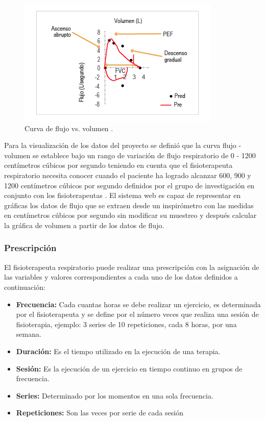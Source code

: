 \documentclass[12pt]{article}
\begin{document}
\begin{itemize}
        \begin{figure}[ht]
        \centering
        \includegraphics[scale=0.7]{imag/flujovs.png}
        \caption{Curva de flujo vs. volumen \cite{36}. }
        \label{4}
        \end{figure}
        \FloatBarrier
    
    
\end{itemize}



Para la visualización de los datos del proyecto se definió que la curva flujo - volumen se establece bajo un rango de variación de flujo respiratorio de  0 - 1200 centímetros cúbicos por segundo teniendo en cuenta que el fisioterapeuta respiratorio necesita conocer cuando el paciente ha logrado alcanzar 600, 900 y 1200 centímetros cúbicos por segundo definidos por el grupo de investigación en conjunto con los fisioterapeutas \cite{45}. El sistema web es capaz de representar en gráficas los datos de flujo que se extraen desde un inspirómetro con las medidas en centímetros cúbicos por segundo sin modificar su muestreo y después calcular la gráfica de volumen a partir de los datos de flujo.


\subsubsection{Prescripción}

El fisioterapeuta respiratorio puede realizar una prescripción con la asignación de las variables y valores correspondientes a cada uno de los datos definidos a continuación: 

\begin{itemize}
    \item \textbf{Frecuencia:} Cada cuantas horas se debe realizar un ejercicio, es determinada por el fisioterapeuta y se define por el número veces que realiza una sesión de fisioterapia, ejemplo: 3 series de 10 repeticiones, cada 8 horas, por una semana.
    \item \textbf{Duración:} Es el tiempo utilizado en la ejecución de una terapia.
    \item \textbf{Sesión:} Es la ejecución de un ejercicio en tiempo continuo en grupos de frecuencia.
    \item \textbf{Series:} Determinado por los momentos en una sola frecuencia.
    \item \textbf{Repeticiones:} Son las veces por serie de cada sesión
\end{itemize}
    
\end{document}
